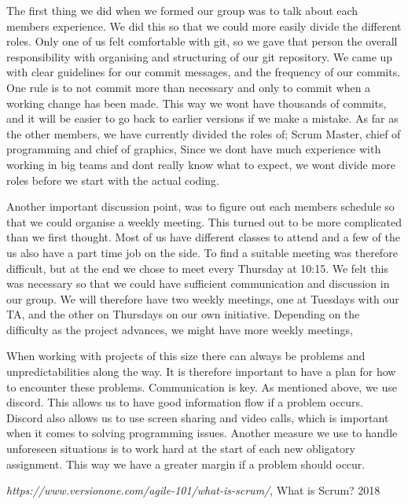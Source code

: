 \documentclass{article}
\begin{document}
The first thing we did when we formed our group was to talk about each members experience. We did this so that we could more easily divide the different roles. Only one of us felt comfortable with git, so we gave that person the overall responsibility with organising and structuring of our git repository. We came up with clear guidelines for our commit messages, and the frequency of our commits. One rule is to not commit more than necessary and only to commit when a working change has been made. This way we wont have thousands of commits, and it will be easier to go back to earlier versions if we make a mistake. As far as the other members, we have currently divided the roles of; Scrum Master, chief of programming and chief of graphics, Since we dont have much experience with working in big teams and dont really know what to expect, we wont divide more roles before we start with the actual coding. \newline

Another important discussion point, was to figure out each members schedule so that we could organise a weekly meeting. This turned out to be more complicated than we first thought. Most of us have different classes to attend and a few of the us also have a part time job on the side. To find a suitable meeting was therefore  difficult, but at the end we chose to meet every Thursday at 10:15. We felt this was necessary so that we could have sufficient communication and discussion in our group. We will therefore have two weekly meetings, one at Tuesdays with our TA, and the other on Thursdays on our own initiative. Depending on the difficulty as the project advances, we might have more weekly meetings,  \newline

When working with projects of this size there can always be problems and unpredictabilities along the way. It is therefore important to have a plan for how to encounter these problems. Communication is key. As mentioned above, we use discord. This allows us to have good information flow if a problem occurs. Discord also allows us to use screen sharing and video calls, which is important when it comes to solving programming issues. Another measure we use to handle unforeseen situations is to work hard at the start of each new obligatory assignment. This way we have a greater margin if a problem should occur. 

\begin{thebibliography}{9}
 
  \textit{https://www.versionone.com/agile-101/what-is-scrum/},
  What is Scrum?
  2018

\end{thebibliography}
\end{document}
